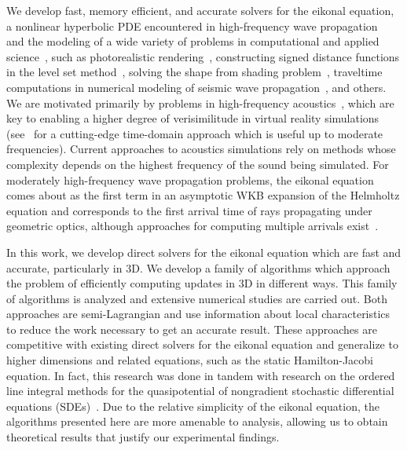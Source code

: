 \documentclass[smallcondensed]{svjour3}
\begin{document}
We develop fast, memory efficient, and accurate solvers for the
eikonal equation, a nonlinear hyperbolic PDE encountered in
high-frequency wave propagation~\cite{engquist2003computational} and
the modeling of a wide variety of problems in computational and
applied science~\cite{sethian1999level}, such as photorealistic
rendering~\cite{ihrke2007eikonal}, constructing signed distance
functions in the level set method~\cite{osher2006level}, solving the
shape from shading
problem~\cite{kimmel2001optimal,prados2006shape,durou2008numerical},
traveltime computations in numerical modeling of seismic wave
propagation~\cite{sethian19993,popovici20023,kim20023,van1991upwind,vidale1990finite},
and others. We are motivated primarily by problems in high-frequency
acoustics~\cite{prislan2016ray}, which are key to enabling a higher
degree of verisimilitude in virtual reality simulations
(see~\cite{raghuvanshi2014parametric,raghuvanshi2018parametric} for a
cutting-edge time-domain approach which is useful up to moderate
frequencies). Current approaches to acoustics simulations rely on
methods whose complexity depends on the highest frequency of the sound
being simulated. For moderately high-frequency wave propagation
problems, the eikonal equation comes about as the first term in an
asymptotic WKB expansion of the Helmholtz equation and corresponds to
the first arrival time of rays propagating under geometric optics,
although approaches for computing multiple arrivals
exist~\cite{fomel2002fast}.

In this work, we develop direct solvers for the eikonal equation which
are fast and accurate, particularly in 3D. We develop a family of
algorithms which approach the problem of efficiently computing updates
in 3D in different ways. This family of algorithms is analyzed and
extensive numerical studies are carried out. Both approaches are
semi-Lagrangian and use information about local characteristics to
reduce the work necessary to get an accurate result. These approaches
are competitive with existing direct solvers for the eikonal equation
and generalize to higher dimensions and related equations, such as the
static Hamilton-Jacobi equation. In fact, this research was done in
tandem with research on the ordered line integral methods for the
quasipotential of nongradient stochastic differential equations
(SDEs)~\cite{dahiya2017ordered,dahiya2018ordered,yang2019computing}.
Due to the relative simplicity of the eikonal equation, the algorithms
presented here are more amenable to analysis, allowing us to obtain
theoretical results that justify our experimental findings.
\end{document}

